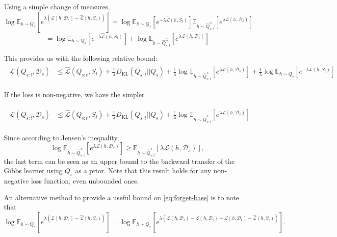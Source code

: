 \documentclass[letterpaper]{article}
\theoremstyle{definition}
\begin{document}
Using a simple change of measures, 
$$\log\mathbb{E}_{h\sim Q_{s}}\left [e^{\lambda(\mathcal{L}(h,\mathcal{D}_s)-\hat{\mathcal{L}}(h,S_t))} \right ]=\log \mathbb{E}_{h\sim Q_s}\left [e^{-\lambda\hat{\mathcal{L}}(h,S_t)} \right ] \mathbb{E}_{h\sim \hat{Q}_{s:t}^{\lambda}}\left [e^{\lambda\mathcal{L}(h,\mathcal{D}_s)} \right ]$$
$$=\log \mathbb{E}_{h\sim Q_s}\left [e^{-\lambda\hat{\mathcal{L}}(h,S_t)} \right ]+\log \mathbb{E}_{h\sim \hat{Q}_{s:t}^{\lambda}}\left [e^{\lambda\mathcal{L}(h,\mathcal{D}_s)} \right ]$$

This provides us with the following relative bound:
\begin{align*}
\begin{split}
\mathcal{L}(Q_{s:t}, \mathcal{D}_s) &\leq \hat{\mathcal{L}}(Q_{s:t}, S_t) + \frac{1}{\lambda} D_{\mathrm{KL}}(Q_{s:t}||Q_{s})
+\frac{1}{\lambda}\log \mathbb{E}_{h\sim \hat{Q}_{s:t}^{\lambda}}\left [e^{\lambda\mathcal{L}(h,\mathcal{D}_s)}\right ]+\frac{1}{\lambda}\log \mathbb{E}_{h\sim Q_s}\left [e^{-\lambda\hat{\mathcal{L}}(h,S_t)} \right ]
\end{split}
\end{align*}

If the loss is non-negative, we have the simpler

\begin{align}
\begin{split}
\mathcal{L}(Q_{s:t}, \mathcal{D}_s) &\leq \hat{\mathcal{L}}(Q_{s:t}, S_t) + \frac{1}{\lambda} D_{\mathrm{KL}}(Q_{s:t}||Q_{s})
+\frac{1}{\lambda}\log \mathbb{E}_{h\sim \hat{Q}_{s:t}^{\lambda}}\left [e^{\lambda\mathcal{L}(h,\mathcal{D}_s)}\right ]
\end{split}
\end{align}

Since according to Jensen's inequality, $$\log \mathbb{E}_{h\sim \hat{Q}_{s:t}^{\lambda}}\left [e^{\lambda\mathcal{L}(h,\mathcal{D}_s)}\right ]\geq \mathbb{E}_{h\sim \hat{Q}_{s:t}^{\lambda}}\left [\lambda\mathcal{L}(h,\mathcal{D}_s)\right ],$$
the last term can be seen as an upper bound to the backward transfer of the Gibbs learner using $Q_s$ as a prior. Note that this result holds for any non-negative loss function, even unbounded ones.

An alternative method to provide a useful bound on \eqref{eq:forget-base} is to note that
$$\log\mathbb{E}_{h\sim Q_{s}}\left [e^{\lambda(\mathcal{L}(h,\mathcal{D}_s)-\hat{\mathcal{L}}(h,S_t))} \right ] = \log\mathbb{E}_{h\sim Q_{s}}\left [e^{\lambda(\mathcal{L}(h,\mathcal{D}_s)-\mathcal{L}(h,\mathcal{D}_t)+\mathcal{L}(h,\mathcal{D}_t)-\hat{\mathcal{L}}(h,S_t))} \right ].$$
\end{document}
